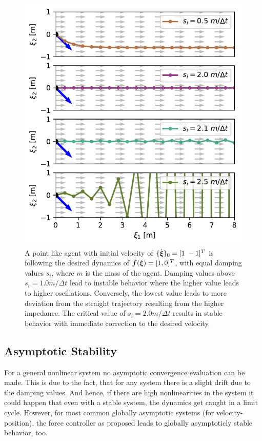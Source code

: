 \begin{figure}[htb]
\centering
  \includegraphics[width=\columnwidth]{figures/discrete_controller_parameters_comparison}
  \caption{A point like agent with initial velocity of $\{ \dot{\boldsymbol{\xi}} \}_0 = [1 \; -1]^T$ is following the desired dynamics of $\boldsymbol{f}(\boldsymbol{\xi}) = [1, 0]^T$, with equal damping values $s_i$, where $m$ is the mass of the agent. Damping values above $s_i = 1.0 m / \Delta t$ lead to instable behavior where the higher value leads to higher oscillations. Conversely, the lowest value leads to more deviation from the straight trajectory resulting from the higher impedance. The critical value of $s_i = 2.0 m / \Delta t$ results in stable behavior with immediate correction to the desired velocity.}
  \label{fig:discrete_controller_parameters_comparison}
\end{figure}


\subsection{Asymptotic Stability}
For a general nonlinear system no asymptotic convergence evaluation can be made. This is due to the fact, that for any system there is a slight drift due to the damping values.
And hence, if there are high nonlinearities in the system it could happen that even with a stable system, the dynamics get caught in a limit cycle. However, for most common globally asymptotic systems (for velocity-position), the force controller as proposed leads to globally asymptoticly stable behavior, too.

